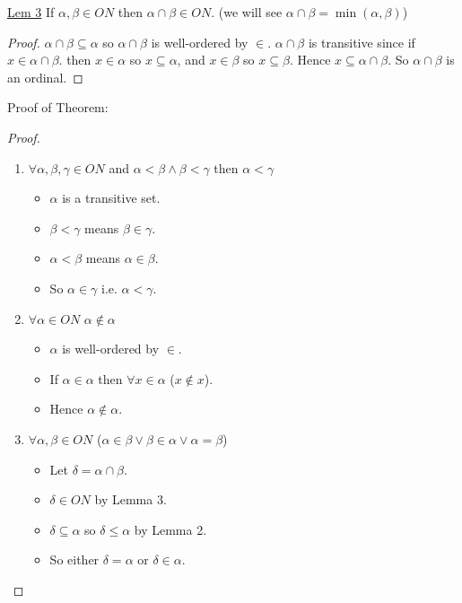 \documentclass{article}
\begin{document}
    \underline{Lem 3} If $\alpha, \beta \in ON$ then $\alpha \cap \beta \in ON$.
    (we will see $\alpha \cap \beta = \min(\alpha, \beta)$)

    \begin{proof}
        $\alpha \cap \beta \subseteq \alpha$ so $\alpha \cap \beta$ is well-ordered by $\in$.
        $\alpha \cap \beta$ is transitive since if $x \in \alpha \cap \beta$.
        then $x \in \alpha$ so $x \subseteq \alpha$, and $x \in \beta$ so $x \subseteq \beta$.
        Hence $x \subseteq \alpha \cap \beta$.
        So $\alpha \cap \beta$ is an ordinal.
    \end{proof}

Proof of Theorem:
\begin{proof}
    \begin{enumerate}
        \item $\forall \alpha, \beta, \gamma \in ON$ and $\alpha < \beta \wedge \beta < \gamma$ then $\alpha < \gamma$
        \begin{itemize}
            \item $\alpha$ is a transitive set.
            \item $\beta < \gamma$ means $\beta \in \gamma$.
            \item $\alpha < \beta$ means $\alpha \in \beta$.
            \item So $\alpha \in \gamma$ i.e. $\alpha < \gamma$.
        \end{itemize}
        \item $\forall \alpha \in ON$ $\alpha \notin \alpha$
        \begin{itemize}
            \item $\alpha$ is well-ordered by $\in$.
            \item If $\alpha \in \alpha$ then $\forall x \in \alpha$ ($x \notin x$).
            \item Hence $\alpha \notin \alpha$.
        \end{itemize}
        \item $\forall \alpha, \beta \in ON$ ($\alpha \in \beta \vee \beta \in \alpha \vee \alpha = \beta$)
        \begin{itemize}
            \item Let $\delta = \alpha \cap \beta$.
            \item $\delta \in ON$ by Lemma 3.
            \item $\delta \subseteq \alpha$ so $\delta \leq \alpha$ by Lemma 2.
            \item So either $\delta = \alpha$ or $\delta \in \alpha$.

\end{itemize}
\end{enumerate}
\end{proof}
\end{document}
